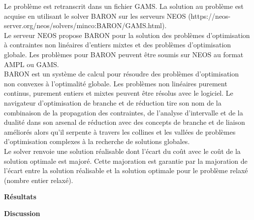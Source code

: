 \documentclass{article}
\begin{document}
\begin{multicols}{2}
    Le problème est retranscrit dans un fichier GAMS. La solution au problème est acquise en utilisant le solver BARON sur les serveurs NEOS (https://neos-server.org/neos/solvers/minco:BARON/GAMS.html).\\
    Le serveur NEOS propose BARON pour la solution des problèmes d'optimisation à contraintes non linéaires d'entiers mixtes et des problèmes d'optimisation globale. Les problèmes pour BARON peuvent être soumis sur NEOS au format AMPL ou GAMS.\\
    BARON est un système de calcul pour résoudre des problèmes d'optimisation non convexes à l'optimalité globale. Les problèmes non linéaires purement continus, purement entiers et mixtes peuvent être résolus avec le logiciel. Le navigateur d'optimisation de branche et de réduction tire son nom de la combinaison de la propagation des contraintes, de l'analyse d'intervalle et de la dualité dans son arsenal de réduction avec des concepts de branche et de liaison améliorés alors qu'il serpente à travers les collines et les vallées de problèmes d'optimisation complexes à la recherche de solutions globales.\\
    Le solver renvoie une solution réalisable dont l'écart
    du coût avec le coût de la solution optimale est majoré. Cette majoration est garantie par la majoration de l'écart entre la solution réalisable et la solution optimale pour le problème relaxé (nombre entier relaxé).
\end{multicols}

\textbf{Résultats}\\

\begin{multicols}{2}
\lipsum[1]
\end{multicols}
\lipsum[1]
\textbf{Discussion}\\
\end{document}
